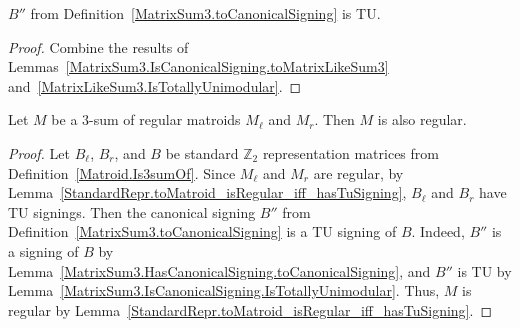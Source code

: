 \begin{lemma}
    \label{MatrixSum3.IsCanonicalSigning.IsTotallyUnimodular}
    \leanok
    $B''$ from Definition~\ref{MatrixSum3.toCanonicalSigning} is TU.
\end{lemma}

\begin{proof}
    \leanok
    Combine the results of Lemmas~\ref{MatrixSum3.IsCanonicalSigning.toMatrixLikeSum3} and~\ref{MatrixLikeSum3.IsTotallyUnimodular}.
\end{proof}

\begin{theorem}
    \label{Matroid.Is3sumOf.isRegular}
    \leanok
    Let $M$ be a $3$-sum of regular matroids $M_{\ell}$ and $M_{r}$. Then $M$ is also regular.
\end{theorem}

\begin{proof}
    Let $B_{\ell}$, $B_{r}$, and $B$ be standard $\mathbb{Z}_{2}$ representation matrices from Definition~\ref{Matroid.Is3sumOf}. Since $M_{\ell}$ and $M_{r}$ are regular, by Lemma~\ref{StandardRepr.toMatroid_isRegular_iff_hasTuSigning}, $B_{\ell}$ and $B_{r}$ have TU signings. Then the canonical signing $B''$ from Definition~\ref{MatrixSum3.toCanonicalSigning} is a TU signing of $B$. Indeed, $B''$ is a signing of $B$ by Lemma~\ref{MatrixSum3.HasCanonicalSigning.toCanonicalSigning}, and $B''$ is TU by Lemma~\ref{MatrixSum3.IsCanonicalSigning.IsTotallyUnimodular}. Thus, $M$ is regular by Lemma~\ref{StandardRepr.toMatroid_isRegular_iff_hasTuSigning}.
\end{proof}
